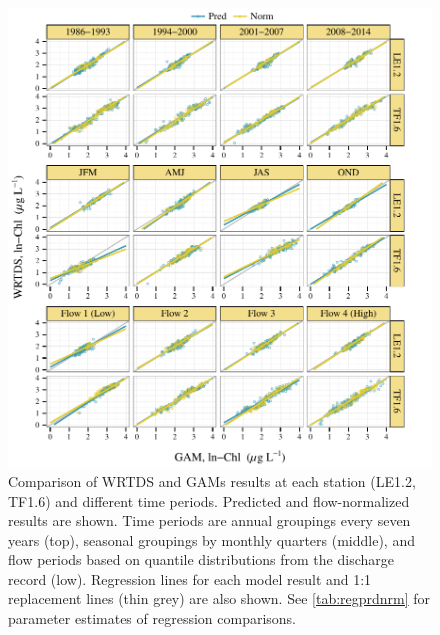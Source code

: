 \documentclass[letterpaper,12pt,oneside]{article}\usepackage[]{graphicx}\usepackage[]{color}
\makeatletter
\def\maxwidth{ %
  \ifdim\Gin@nat@width>\linewidth
    \linewidth
  \else
    \Gin@nat@width
  \fi
}
\makeatother
\begin{document}
\begin{figure}[!ht]

{\centering \includegraphics[width=\maxwidth]{figs/regprdnrm-1} 

}

\caption{Comparison of \ac{WRTDS} and \acp{GAM} results at each station (LE1.2, TF1.6) and different time periods.  Predicted and flow-normalized results are shown.  Time periods are annual groupings every seven years (top), seasonal groupings by monthly quarters (middle), and flow periods based on quantile distributions from the discharge record (low).  Regression lines for each model result and 1:1 replacement lines (thin grey) are also shown.  See \cref{tab:regprdnrm} for parameter estimates of regression comparisons.}\label{fig:regprdnrm}
\end{figure}



\end{document}
